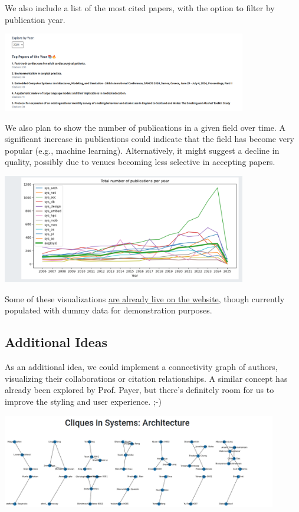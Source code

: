\documentclass{article}
\begin{document}
We also include a list of the most cited papers, with the option to filter by publication year.

\begin{center}
\includegraphics[width=0.8\textwidth]{./pictures/top_papers.png}
\end{center}

We also plan to show the number of publications in a given field over time.
A significant increase in publications could indicate that the field has become very popular (e.g., machine learning).
Alternatively, it might suggest a decline in quality, possibly due to venues becoming less selective in accepting papers.

\begin{center}
\includegraphics[width=0.8\textwidth]{./pictures/number_of_publications.png}
\end{center}

Some of these visualizations \href{https://com-480-data-visualization.github.io/DSM/}{are already live on the website}, though currently populated with dummy data for demonstration purposes.

\subsection{Additional Ideas}
As an additional idea, we could implement a connectivity graph of authors, visualizing their collaborations or citation relationships.
A similar concept has already been explored by Prof. Payer, but there’s definitely room for us to improve the styling and user experience. ;-)

\begin{center}
\includegraphics[width=0.9\textwidth]{./pictures/cliques.png}
\end{center}
\end{document}
